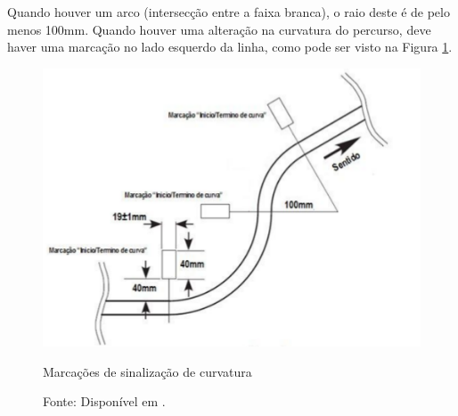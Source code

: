 Quando houver um arco (intersecção entre a faixa branca), o raio deste é de pelo menos 100mm. Quando houver uma 
alteração na curvatura do percurso, deve haver uma marcação no lado esquerdo da linha, como pode ser visto na Figura 
\ref{fig:percurso4}.\par

\begin{figure}[t!]
 \centering
 \captionsetup{width=0.68\textwidth,font=footnotesize,textfont=bf}
 \includegraphics[scale=0.6]{figuras/Percurso4.png}
 \caption{Marcações de sinalização de curvatura \label{fig:percurso4}}
 \vspace{-0.3cm}
 \caption*{Fonte: Disponível em \cite[p.4]{RegrasRobocore}.}
\end{figure}


















